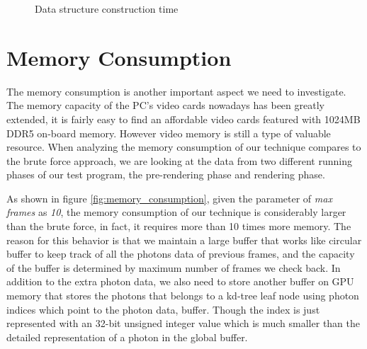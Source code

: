 \begin{figure}[ftp] 
    \centering 
    \renewcommand{\thefigure}{\thechapter.\arabic{figure}}
    \caption[]{Data structure construction time}
    \label{fig:construction_time} 
\end{figure} 

\section{Memory Consumption} 

The memory consumption is another important aspect we need to investigate. The memory capacity of the PC's video cards nowadays has been greatly extended, it is fairly easy to find an affordable video cards featured with 1024MB DDR5 on-board memory. However video memory is still a type of valuable resource. When analyzing the memory consumption of our technique compares to the brute force approach, we are looking at the data from two different running phases of our test program, the pre-rendering phase and rendering phase. 

As shown in figure \ref{fig:memory_consumption}, given the parameter of \emph{max frames} as \emph{10}, the memory consumption of our technique is considerably larger than the brute force, in fact, it requires more than 10 times more memory. The reason for this behavior is that we maintain a large buffer that works like circular buffer to keep track of all the photons data of previous frames, and the capacity of the buffer is determined by maximum number of frames we check back. In addition to the extra photon data, we also need to store another buffer on GPU memory that stores the photons that belongs to a kd-tree leaf node using photon indices which point to the photon data, buffer. Though the index is just represented with an 32-bit unsigned integer value which is much smaller than the detailed representation of a photon in the global buffer. 


